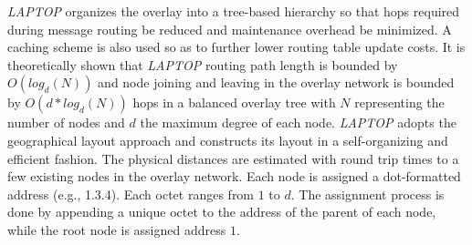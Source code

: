 \emph{LAPTOP} \cite{WLH2007} organizes the overlay 
into a tree-based hierarchy so that 
hops required during message routing be reduced and 
maintenance overhead be minimized.
A caching scheme is also used so as
to further lower routing table update costs. 
It is theoretically shown that 
\emph{LAPTOP} routing path length is bounded by $O(log_d(N))$ and node
joining and leaving in the overlay network is bounded by
$O(d*log_d(N))$ hops in a balanced overlay tree with $N$ representing the
number of nodes and $d$ the maximum degree of each node. 
\emph{LAPTOP} 
adopts the geographical layout approach  
and constructs its layout in a self-organizing and 
efficient fashion. 
The physical distances are estimated
with round trip times to a few existing nodes in the overlay network.
Each node is assigned a dot-formatted address (e.g., 1.3.4). 
Each octet ranges from
$1$ to $d$.
The assignment process is done by appending a unique octet 
to the address of the parent of each node, while
the root node is assigned address $1$.

%

